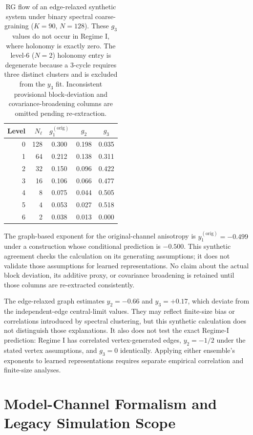 \documentclass[twoside,11pt]{article}
\begin{document}
\begin{table}[t]
\centering
\caption{RG flow of an edge-relaxed synthetic system under binary spectral coarse-graining ($K=90$, $N=128$). These $g_3$ values do not occur in Regime I, where holonomy is exactly zero. The level-6 ($N=2$) holonomy entry is degenerate because a 3-cycle requires three distinct clusters and is excluded from the $y_3$ fit. Inconsistent provisional block-deviation and covariance-broadening columns are omitted pending re-extraction.}
\label{tab:rg_flow_supp}
\begin{tabular}{rrccc}
\toprule
\textbf{Level} & $N_\ell$ & $g_1^{(\mathrm{orig})}$ & $g_2$ & $g_3$ \\
\midrule
0 & 128 & 0.300 & 0.198 & 0.035 \\
1 & 64 & 0.212 & 0.138 & 0.311 \\
2 & 32 & 0.150 & 0.096 & 0.422 \\
3 & 16 & 0.106 & 0.066 & 0.477 \\
4 & 8 & 0.075 & 0.044 & 0.505 \\
5 & 4 & 0.053 & 0.027 & 0.518 \\
6 & 2 & 0.038 & 0.013 & 0.000 \\
\bottomrule
\end{tabular}
\end{table}

The graph-based exponent for the original-channel anisotropy is $y_1^{(\mathrm{orig})}=-0.499$ under a construction whose conditional prediction is $-0.500$. This synthetic agreement checks the calculation on its generating assumptions; it does not validate those assumptions for learned representations. No claim about the actual block deviation, its additive proxy, or covariance broadening is retained until those columns are re-extracted consistently.

The edge-relaxed graph estimates $y_2=-0.66$ and $y_3=+0.17$, which deviate from the independent-edge central-limit values. They may reflect finite-size bias or correlations introduced by spectral clustering, but this synthetic calculation does not distinguish those explanations. It also does not test the exact Regime-I prediction: Regime I has correlated vertex-generated edges, $y_2=-1/2$ under the stated vertex assumptions, and $g_3=0$ identically. Applying either ensemble's exponents to learned representations requires separate empirical correlation and finite-size analyses.


\section{Model-Channel Formalism and Legacy Simulation Scope}
\label{app:symmetry_breaking_sims_supp}
\end{document}
